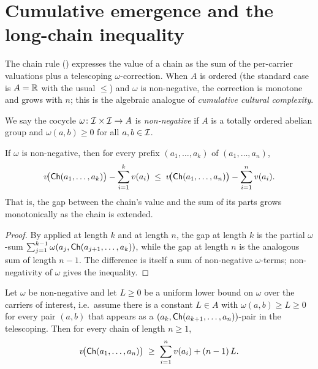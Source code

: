 \section{Cumulative emergence and the long-chain inequality}
\label{sec:long-chain}

The chain rule () expresses the value of a chain
as the sum of the per-carrier valuations plus a telescoping
$\omega$-correction. When $A$ is ordered (the standard case is
$A=\mathbb{R}$ with the usual $\le$) and $\omega$ is non-negative, the
correction is monotone and grows with $n$; this is the algebraic
analogue of \emph{cumulative cultural complexity}.

\begin{definition}\label{def:nonneg-omega}
We say the cocycle $\omega\colon\mathcal{I}\times\mathcal{I}\to A$ is
\emph{non-negative} if $A$ is a totally ordered abelian group and
$\omega(a,b)\ge 0$ for all $a,b\in\mathcal{I}$.
\end{definition}

\begin{proposition}\label{prop:cum-mon}
If $\omega$ is non-negative, then for every prefix
$(a_1,\dots,a_k)$ of $(a_1,\dots,a_n)$,
\[
v\!\bigl(\mathsf{Ch}(a_1,\dots,a_k)\bigr)
- \sum_{i=1}^{k} v(a_i)
\;\le\;
v\!\bigl(\mathsf{Ch}(a_1,\dots,a_n)\bigr)
- \sum_{i=1}^{n} v(a_i).
\]
That is, the gap between the chain's value and the sum of its parts
grows monotonically as the chain is extended.
\end{proposition}

\begin{proof}
By  applied at length $k$ and at length $n$, the
gap at length $k$ is the partial $\omega$-sum
$\sum_{j=1}^{k-1}\omega(a_j,\mathsf{Ch}(a_{j+1},\dots,a_k))$, while the gap
at length $n$ is the analogous sum of length $n-1$. The difference is
itself a sum of non-negative $\omega$-terms; non-negativity of
$\omega$ gives the inequality.
\end{proof}

\begin{theorem}\label{thm:long-chain}
Let $\omega$ be non-negative and let $L\ge 0$ be a uniform lower bound
on $\omega$ over the carriers of interest, i.e.\ assume there is a
constant $L\in A$ with $\omega(a,b)\ge L\ge 0$ for every pair $(a,b)$
that appears as a $(a_k,\mathsf{Ch}(a_{k+1},\dots,a_n))$-pair in the
telescoping. Then for every chain of length $n\ge 1$,
\[
v\!\bigl(\mathsf{Ch}(a_1,\dots,a_n)\bigr)
\;\ge\;
\sum_{i=1}^{n} v(a_i) + (n-1)\,L.
\]
\end{theorem}

